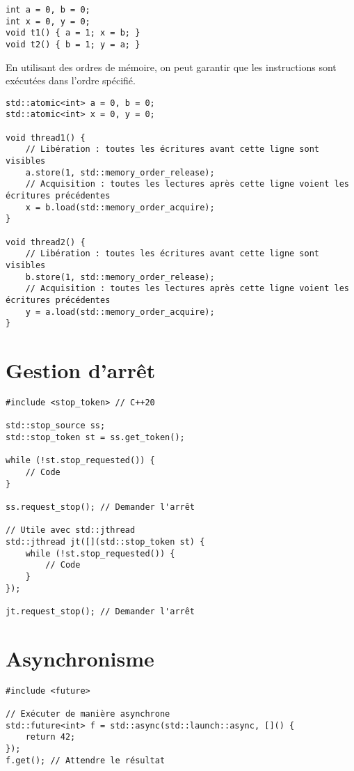 \documentclass{article}
\begin{document}
\begin{multicols*}{3}
\begin{lstlisting}
int a = 0, b = 0;
int x = 0, y = 0;
void t1() { a = 1; x = b; }
void t2() { b = 1; y = a; }
\end{lstlisting}

En utilisant des ordres de mémoire, on peut garantir que les instructions sont exécutées dans l'ordre spécifié.

\begin{lstlisting}
std::atomic<int> a = 0, b = 0;
std::atomic<int> x = 0, y = 0;

void thread1() {
    // Libération : toutes les écritures avant cette ligne sont visibles
    a.store(1, std::memory_order_release);
    // Acquisition : toutes les lectures après cette ligne voient les écritures précédentes
    x = b.load(std::memory_order_acquire);
}

void thread2() {
    // Libération : toutes les écritures avant cette ligne sont visibles
    b.store(1, std::memory_order_release);
    // Acquisition : toutes les lectures après cette ligne voient les écritures précédentes
    y = a.load(std::memory_order_acquire);
}
\end{lstlisting}

\section*{Gestion d'arrêt}
\begin{lstlisting}
#include <stop_token> // C++20

std::stop_source ss;
std::stop_token st = ss.get_token();

while (!st.stop_requested()) {
    // Code
}

ss.request_stop(); // Demander l'arrêt

// Utile avec std::jthread
std::jthread jt([](std::stop_token st) {
    while (!st.stop_requested()) {
        // Code
    }
});

jt.request_stop(); // Demander l'arrêt
\end{lstlisting}

\section*{Asynchronisme}

\begin{lstlisting}
#include <future>

// Exécuter de manière asynchrone
std::future<int> f = std::async(std::launch::async, []() {
    return 42;
});
f.get(); // Attendre le résultat


\end{lstlisting}
\end{multicols*}
\end{document}
